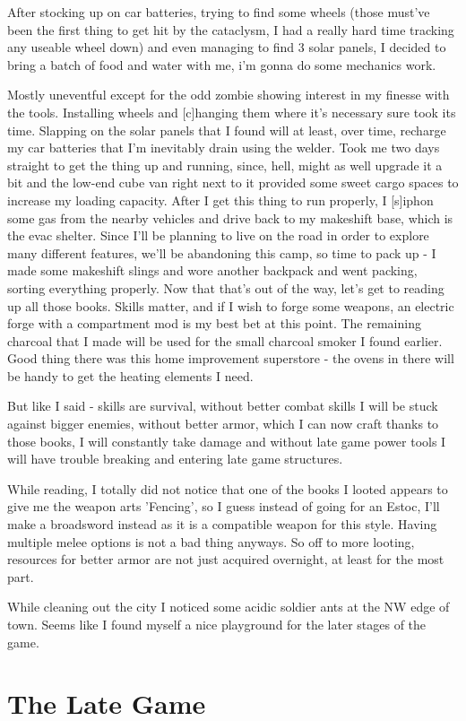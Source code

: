 After stocking up on car batteries, trying to find some wheels (those must've been the first thing to get hit by the cataclysm, I had a really hard time tracking any useable wheel down) and even managing to find 3 solar panels, I decided to bring a batch of food and water with me, i'm gonna do some mechanics work.

Mostly uneventful except for the odd zombie showing interest in my finesse with the tools. Installing wheels and [c]hanging them where it's necessary sure took its time. Slapping on the solar panels that I found will at least, over time, recharge my car batteries that I'm inevitably drain using the welder. Took me two days straight to get the thing up and running, since, hell, might as well upgrade it a bit and the low-end cube van right next to it provided some sweet cargo spaces to increase my loading capacity. After I get this thing to run properly, I [s]iphon some gas from the nearby vehicles and drive back to my makeshift base, which is the evac shelter. Since I'll be planning to live on the road in order to explore many different features, we'll be abandoning this camp, so time to pack up - I made some makeshift slings and wore another backpack and went packing, sorting everything properly. Now that that's out of the way, let's get to reading up all those books. Skills matter, and if I wish to forge some weapons, an electric forge with a compartment mod is my best bet at this point. The remaining charcoal that I made will be used for the small charcoal smoker I found earlier. Good thing there was this home improvement superstore - the ovens in there will be handy to get the heating elements I need.

But like I said - skills are survival, without better combat skills I will be stuck against bigger enemies, without better armor, which I can now craft thanks to those books, I will constantly take damage and without late game power tools I will have trouble breaking and entering late game structures.

While reading, I totally did not notice that one of the books I looted appears to give me the weapon arts 'Fencing', so I guess instead of going for an Estoc, I'll make a broadsword instead as it is a compatible weapon for this style. Having multiple melee options is not a bad thing anyways. So off to more looting, resources for better armor are not just acquired overnight, at least for the most part.

While cleaning out the city I noticed some acidic soldier ants at the NW edge of town. Seems like I found myself a nice playground for the later stages of the game.

\section{The Late Game}